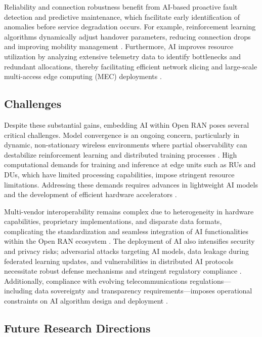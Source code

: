 \documentclass[sigconf]{acmart}
\begin{document}
Reliability and connection robustness benefit from AI-based proactive fault detection and predictive maintenance, which facilitate early identification of anomalies before service degradation occurs. For example, reinforcement learning algorithms dynamically adjust handover parameters, reducing connection drops and improving mobility management \cite{ref54}. Furthermore, AI improves resource utilization by analyzing extensive telemetry data to identify bottlenecks and redundant allocations, thereby facilitating efficient network slicing and large-scale multi-access edge computing (MEC) deployments \cite{ref49}.

\subsection{Challenges}

Despite these substantial gains, embedding AI within Open RAN poses several critical challenges. Model convergence is an ongoing concern, particularly in dynamic, non-stationary wireless environments where partial observability can destabilize reinforcement learning and distributed training processes \cite{ref54}. High computational demands for training and inference at edge units such as RUs and DUs, which have limited processing capabilities, impose stringent resource limitations. Addressing these demands requires advances in lightweight AI models and the development of efficient hardware accelerators \cite{ref48}.

Multi-vendor interoperability remains complex due to heterogeneity in hardware capabilities, proprietary implementations, and disparate data formats, complicating the standardization and seamless integration of AI functionalities within the Open RAN ecosystem \cite{ref49}. The deployment of AI also intensifies security and privacy risks; adversarial attacks targeting AI models, data leakage during federated learning updates, and vulnerabilities in distributed AI protocols necessitate robust defense mechanisms and stringent regulatory compliance \cite{ref50}. Additionally, compliance with evolving telecommunications regulations—including data sovereignty and transparency requirements—imposes operational constraints on AI algorithm design and deployment \cite{ref48}.

\subsection{Future Research Directions}
\end{document}
